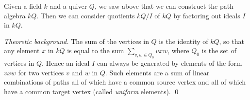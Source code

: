 \documentclass{amsart}
\theoremstyle{definition}
\theoremstyle{theoretic}
\newenvironment{theoback}
{\medskip\footnotesize\textit{Theoretic background.} }
{\qed\par\medskip}
\begin{document}
Given a field $k$ and a quiver $Q$, we saw above that we can construct
the path algebra $kQ$.  Then we can consider quotients $kQ/I$ of $kQ$
by factoring out ideals $I$ in $kQ$.  


\begin{theoback} The sum of the vertices in $Q$
is the identity of $kQ$, so that any element $x$ in $kQ$ is equal to
the sum $\sum_{v,w\in Q_0} vxw$, where $Q_0$ is the set of vertices in
$Q$.  Hence an ideal $I$ can always be generated by elements of the
form $vxw$ for two vertices $v$ and $w$ in $Q$.  Such elements are a
sum of linear combinations of paths all of which have a common source
vertex and all of which have a common target vertex (called
\emph{uniform} elements).
\end{theoback}
\end{document}
